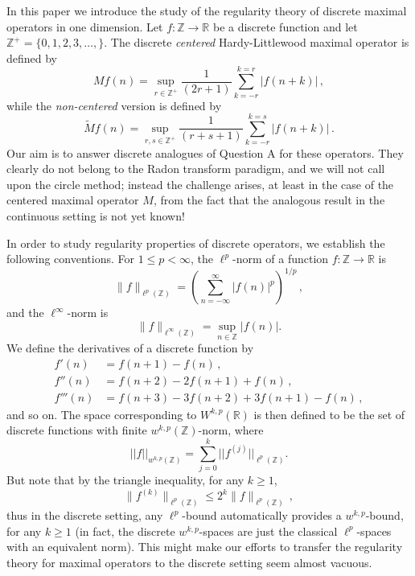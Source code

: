 \documentclass[reqno]{amsart}
\theoremstyle{definition}
\theoremstyle{remark}
\numberwithin{equation}{section}
\newcommand{\R}{\mathbb{R}}
\newcommand{\Z}{\mathbb{Z}}
\newcommand{\wM}{\widetilde{M}}
\begin{document}
In this paper we introduce the study of the regularity theory of discrete maximal operators in one dimension.
Let $f: \Z \to \R$ be a discrete function and let $\Z^+ = \{0, 1, 2, 3, \ldots,\}$.
The discrete {\it centered} Hardy-Littlewood maximal operator is defined by
\begin{equation*}
 Mf(n) = \sup_{r \in \Z^{+}} \frac{1}{(2r + 1)} \sum_{k=-r}^{k=r} |f(n+k)|\,,
\end{equation*}
while the {\it non-centered} version is defined by
\begin{equation*}
 \wM  f(n) = \sup_{r,s \in \Z^{+}} \frac{1}{(r +s+ 1)} \sum_{k=-r}^{k=s} |f(n+k)|\,.
\end{equation*}
Our aim is to answer discrete analogues of Question A for these operators. They clearly do not belong to the Radon transform paradigm, and we will not call upon the circle method; instead the challenge arises, at least in the case of the centered maximal operator $M$, from the fact that the analogous result in the continuous setting is not yet known!



In order to study regularity properties of discrete operators, we establish the following conventions.
For $1 \leq p <\infty$, the $\ell^p$-norm of a function $f: \Z \to \R$ is
\begin{equation*}
 \|f\|_{\ell^p(\Z)} = \left(\sum_{n=-\infty}^{\infty} |f(n)|^p \right)^{1/p}\,,
\end{equation*}
and the $\ell^{\infty}$-norm is 
\begin{equation*}
 \|f\|_{\ell^{\infty}(\Z)} = \sup_{n \in \Z} |f(n)|.
\end{equation*}
We define the derivatives of a discrete function by 
\begin{align*}
 f'(n) &= f(n+1) - f(n)\,,\\
f''(n) & = f(n+2) - 2f(n+1) + f(n)\,,\\
f'''(n) & = f(n+3) - 3f(n+2) + 3 f(n+1) - f(n)\,,
\end{align*}
and so on. 
The space corresponding to $W^{k,p}(\R)$ is then defined to be the set of discrete functions with finite $w^{k,p}(\Z)$-norm, where
\[ ||f||_{w^{k,p}(\Z)}  = \sum_{j=0}^k ||f^{(j)}||_{\ell^p(\Z)}.\]
But note that by the triangle inequality, for any $k \geq 1$, 
\begin{equation}\label{TI}
 \|f^{(k)}\|_{\ell^p(\Z)} \leq 2^k \|f\|_{\ell^p(\Z)} \,,
\end{equation}
thus in the discrete setting, any $\ell^p$-bound automatically provides a $w^{k,p}$-bound, for any $k \geq 1$ (in fact, the discrete $w^{k,p}$-spaces are just the classical $\ell^p$-spaces with an equivalent norm).  
This might make our efforts to transfer the regularity theory for maximal operators to the discrete setting seem almost vacuous.
\end{document}
